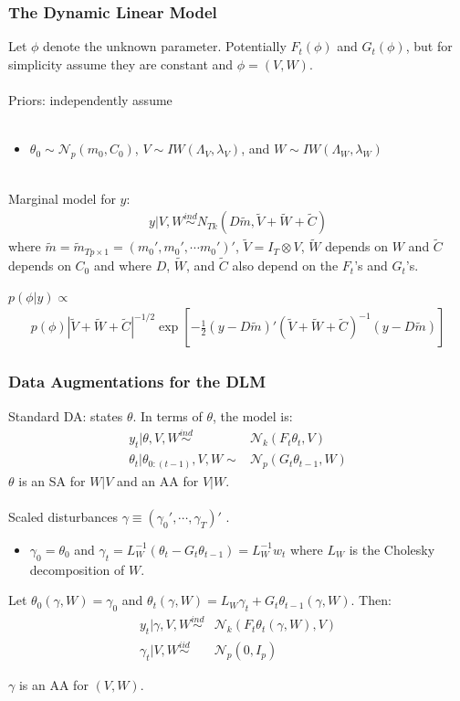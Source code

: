 \documentclass[xcolor=dvipsnames]{beamer}
\newcommand\N{\mathcal{N}}
\begin{document}
\begin{frame}
  \frametitle{The Dynamic Linear Model} 
Let $\phi$ denote the unknown parameter. Potentially $F_t(\phi)$ and $G_t(\phi)$, but for simplicity assume they are constant and $\phi=(V,W)$.\\~\\

Priors: independently assume \\~\\
\begin{itemize}
\item[]$\theta_0\sim \N_p(m_0,C_0)$, $V\sim IW(\Lambda_V,\lambda_V)$, and $W\sim IW(\Lambda_W,\lambda_W)$\\~\\
\end{itemize}


Marginal model for $y$: 
\begin{align*}
  y|V,W \stackrel{ind}{\sim} N_{Tk}(D\tilde{m}, \tilde{V} + \tilde{W} + \tilde{C})
\end{align*}
where $\tilde{m}=\tilde{m}_{Tp\times 1} = (m_0', m_0', \cdots m_0')'$, $\tilde{V}=I_T\otimes V$, $\tilde{W}$ depends on $W$ and $\tilde{C}$ depends on $C_0$ and where $D$, $\tilde{W}$, and $\tilde{C}$ also depend on the $F_t$'s and $G_t$'s.

$p(\phi|y)\propto$
\begin{align*}
p(\phi)|\tilde{V} + \tilde{W} + \tilde{C}|^{-1/2}\exp\left[-\frac{1}{2}\left(y-D\tilde{m}\right)'(\tilde{V} + \tilde{W} + \tilde{C})^{-1}\left(y-D\tilde{m}\right)\right]
\end{align*}

\end{frame}

\begin{frame}
\frametitle{Data Augmentations for the DLM}
Standard DA: states $\theta$. In terms of $\theta$, the model is:
\begin{align*}
y_t|\theta,V,W \stackrel{ind}{\sim} & \N_k(F_t\theta_t,V)\\ 
\theta_t|\theta_{0:(t-1)},V,W \sim & \N_p(G_t\theta_{t-1},W)
\end{align*} 
{\color{blue}$\theta$ is an SA for $W|V$ and an AA for $V|W$.}\\~\\

Scaled disturbances $\gamma\equiv(\gamma_0',\cdots,\gamma_T)'$ \citep{fruhwirth2004efficient}.
\begin{itemize}
\item[]$\gamma_0=\theta_0$ and $\gamma_t=L_W^{-1}(\theta_t - G_t\theta_{t-1})=L_W^{-1}w_t$ where $L_W$ is the Cholesky decomposition of $W$.
\end{itemize}
Let $\theta_0(\gamma,W)=\gamma_0$ and $\theta_t(\gamma,W)=L_W\gamma_t + G_t\theta_{t-1}(\gamma,W)$. Then:
\begin{align*}
y_t|\gamma,V,W \stackrel{ind}{\sim} & \N_k(F_t\theta_t(\gamma,W),V) \\
\gamma_t|V,W \stackrel{iid}{\sim} & \N_p(0,I_p)
\end{align*} 

{\color{blue}$\gamma$ is an AA for $(V,W)$.}

\end{frame}
\end{document}
